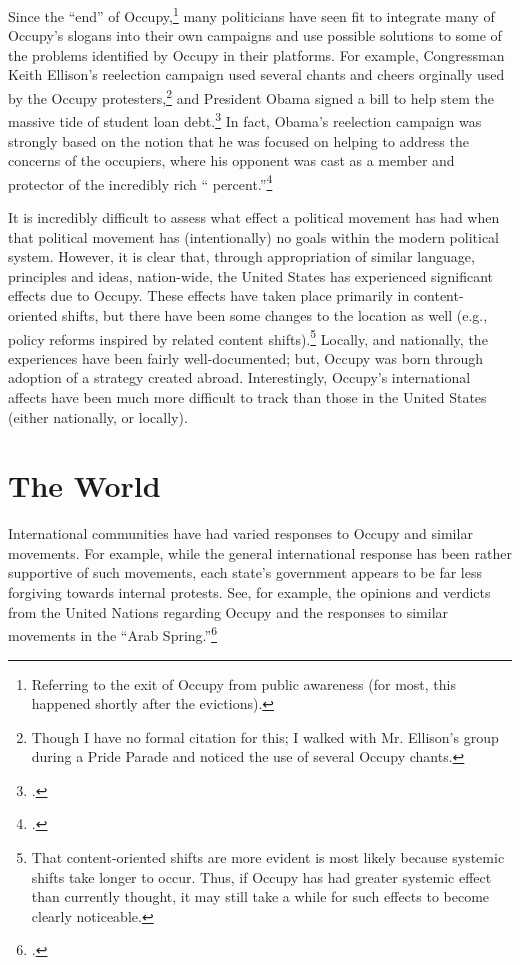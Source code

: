 \documentclass[openany,twoside]{memoir}
\begin{document}
\begin{Spacing}{2}
Since the ``end'' of Occupy,\footnote{
Referring to the exit of Occupy from public awareness (for most, this happened shortly after the evictions).}
many politicians have seen fit to integrate many of Occupy's slogans into their own campaigns and use possible solutions to some of the problems identified by Occupy in their platforms.
For example, Congressman Keith Ellison's reelection campaign used several chants and cheers orginally used by the Occupy protesters,\footnote{
Though I have no formal citation for this; I walked with Mr. Ellison's group during a Pride Parade and noticed the use of several Occupy chants.}
and President Obama signed a bill to help stem the massive tide of student loan debt.\footcite{madison11}
In fact, Obama's reelection campaign was strongly based on the notion that he was focused on helping to address the concerns of the occupiers, where his opponent was cast as a member and protector of the incredibly rich `` percent.''\footcite{cillizza13}

It is incredibly difficult to assess what effect a political movement has had when that political movement has (intentionally) no goals within the modern political system.
However, it is clear that, through appropriation of similar language, principles and ideas, nation-wide, the United States has experienced significant effects due to Occupy.
These effects have taken place primarily in content-oriented shifts, but there have been some changes to the location as well (e.g., policy reforms inspired by related content shifts).\footnote{
That content-oriented shifts are more evident is most likely because systemic shifts take longer to occur.
Thus, if Occupy has had greater systemic effect than currently thought, it may still take a while for such effects to become clearly noticeable.}
Locally, and nationally, the experiences have been fairly well-documented; but, Occupy was born through adoption of a strategy created abroad.
Interestingly, Occupy's international affects have been much more difficult to track than those in the United States (either nationally, or locally).

\section{The World}
International communities have had varied responses to Occupy and similar movements.
For example, while the general international response has been rather supportive of such movements, each state's government appears to be far less forgiving towards internal protests.
See, for example, the opinions and verdicts from the United Nations regarding Occupy and the responses to similar movements in the ``Arab Spring.''\footcite{froomkin11,cihrs12}


\end{Spacing}
\end{document}
